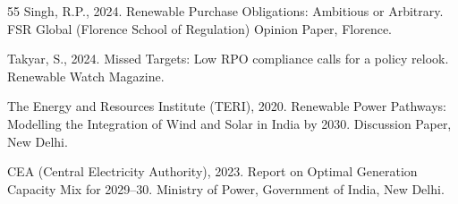 \documentclass[11pt,a4paper]{article}
\begin{document}
\begin{thebibliography}{55}
Singh, R.P., 2024.
Renewable Purchase Obligations: Ambitious or Arbitrary. FSR Global (Florence School of Regulation) Opinion Paper, Florence.

Takyar, S., 2024.
Missed Targets: Low RPO compliance calls for a policy relook. Renewable Watch Magazine.

The Energy and Resources Institute (TERI), 2020.
Renewable Power Pathways: Modelling the Integration of Wind and Solar in India by 2030. Discussion Paper, New Delhi.





CEA (Central Electricity Authority), 2023.
Report on Optimal Generation Capacity Mix for 2029--30.
Ministry of Power, Government of India, New Delhi.



\end{thebibliography}
\end{document}
